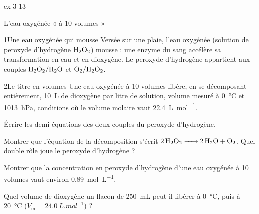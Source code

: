 \begin{blocLivre}{ex-3-13}
\begin{exercice}[3]{L'eau oxygénée « à 10 volumes »}
\begin{docu}{1}{Une eau oxygénée qui mousse}
Versée sur une plaie, l'eau oxygénée (solution de peroxyde d'hydrogène $\ce{H2O2}$) mousse : une enzyme du sang accélère sa
transformation en eau et en dioxygène. Le peroxyde d'hydrogène appartient aux couples $\ce{H2O2}/\ce{H2O}$ et $\ce{O2}/\ce{H2O2}$.
\end{docu}
\begin{docu}{2}{Le titre en volumes}
Une eau oxygénée à 10 volumes libère, en se décomposant entièrement, \qty{10}{L} de dioxygène par litre de solution,
volume mesuré à \qty{0}{\degreeCelsius} et \qty{1013}{hPa}, conditions où le volume molaire vaut \qty{22,4}{L.mol^{-1}}.
\end{docu}
\begin{questions}
\item Écrire les demi-équations des deux couples du peroxyde d'hydrogène.
\item Montrer que l'équation de la décomposition s'écrit $\ce{2H2O2 -> 2H2O + O2}$. Quel double rôle joue le peroxyde d'hydrogène ?
\item \initiative Montrer que la concentration en peroxyde d'hydrogène d'une eau oxygénée à 10 volumes vaut environ
\qty{0,89}{mol.L^{-1}}.
\item Quel volume de dioxygène un flacon de \qty{250}{mL} peut-il libérer à \qty{0}{\degreeCelsius}, puis à \qty{20}{\degreeCelsius} ($V_\mathrm{m}=\qty{24,0}{L.mol^{-1}}$) ?
\end{questions}
\end{exercice}
\end{blocLivre}
